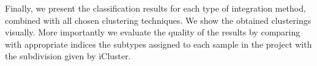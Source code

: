 Finally, we present the classification results for each type of integration method, combined with all chosen clustering techniques. We show the obtained clusterings visually. More importantly we evaluate the quality of the results by comparing with appropriate indices the subtypes assigned to each sample in the project with the subdivision given by iCluster.